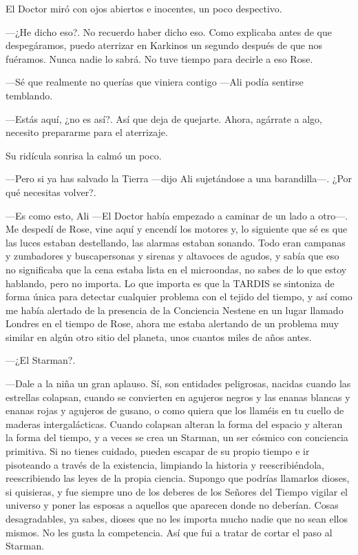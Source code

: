 El Doctor miró con ojos abiertos e inocentes, un poco despectivo.

---¿He dicho eso?. No recuerdo haber dicho eso. Como explicaba antes de
que despegáramos, puedo aterrizar en Karkinos un segundo después de que
nos fuéramos. Nunca nadie lo sabrá. No tuve tiempo para decirle a eso
Rose.

---Sé que realmente no querías que viniera contigo ---Ali podía sentirse
temblando.

---Estás aquí, ¿no es así?. Así que deja de quejarte. Ahora, agárrate a
algo, necesito prepararme para el aterrizaje.

Su ridícula sonrisa la calmó un poco.

---Pero si ya has salvado la Tierra ---dijo Ali sujetándose a una
barandilla---. ¿Por qué necesitas volver?.

---Es como esto, Ali ---El Doctor había empezado a caminar de un lado a
otro---. Me despedí de Rose, vine aquí y encendí los motores y, lo
siguiente que sé es que las luces estaban destellando, las alarmas
estaban sonando. Todo eran campanas y zumbadores y buscapersonas y
sirenas y altavoces de agudos, y sabía que eso no significaba que la
cena estaba lista en el microondas, no sabes de lo que estoy hablando,
pero no importa. Lo que importa es que la TARDIS se sintoniza de forma
única para detectar cualquier problema con el tejido del tiempo, y así
como me había alertado de la presencia de la Conciencia Nestene en un
lugar llamado Londres en el tiempo de Rose, ahora me estaba alertando de
un problema muy similar en algún otro sitio del planeta, unos cuantos
miles de años antes.

---¿El Starman?.

---Dale a la niña un gran aplauso. Sí, son entidades peligrosas, nacidas
cuando las estrellas colapsan, cuando se convierten en agujeros negros y
las enanas blancas y enanas rojas y agujeros de gusano, o como quiera
que los llaméis en tu cuello de maderas intergalácticas. Cuando colapsan
alteran la forma del espacio y alteran la forma del tiempo, y a veces se
crea un Starman, un ser cósmico con conciencia primitiva. Si no tienes
cuidado, pueden escapar de su propio tiempo e ir pisoteando a través de
la existencia, limpiando la historia y reescribiéndola, reescribiendo
las leyes de la propia ciencia. Supongo que podrías llamarlos dioses, si
quisieras, y fue siempre uno de los deberes de los Señores del Tiempo
vigilar el universo y poner las esposas a aquellos que aparecen donde no
deberían. Cosas desagradables, ya sabes, dioses que no les importa mucho
nadie que no sean ellos mismos. No les gusta la competencia. Así que fui
a tratar de cortar el paso al Starman.

